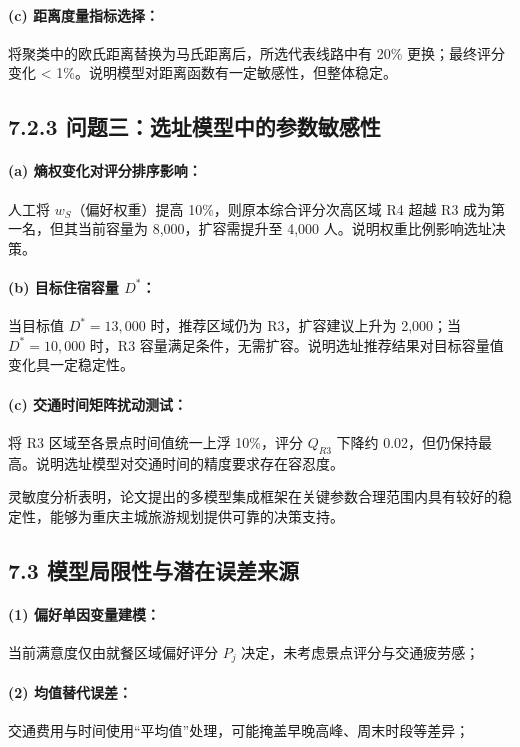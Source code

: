 \documentclass[12pt,a4paper]{article}
\begin{document}
\paragraph{(c) 距离度量指标选择：}
将聚类中的欧氏距离替换为马氏距离后，所选代表线路中有 20\% 更换；最终评分变化 < 1\%。说明模型对距离函数有一定敏感性，但整体稳定。

\subsection*{7.2.3 问题三：选址模型中的参数敏感性}

\paragraph{(a) 熵权变化对评分排序影响：}
人工将 $w_S$（偏好权重）提高 10\%，则原本综合评分次高区域 R4 超越 R3 成为第一名，但其当前容量为 8,000，扩容需提升至 4,000 人。说明权重比例影响选址决策。

\paragraph{(b) 目标住宿容量 $D^*$：}
当目标值 $D^* = 13,000$ 时，推荐区域仍为 R3，扩容建议上升为 2,000；当 $D^* = 10,000$ 时，R3 容量满足条件，无需扩容。说明选址推荐结果对目标容量值变化具一定稳定性。

\paragraph{(c) 交通时间矩阵扰动测试：}
将 R3 区域至各景点时间值统一上浮 10\%，评分 $Q_{R3}$ 下降约 0.02，但仍保持最高。说明选址模型对交通时间的精度要求存在容忍度。

灵敏度分析表明，论文提出的多模型集成框架在关键参数合理范围内具有较好的稳定性，能够为重庆主城旅游规划提供可靠的决策支持。

\subsection*{7.3 模型局限性与潜在误差来源}

\paragraph{(1) 偏好单因变量建模：} 当前满意度仅由就餐区域偏好评分 $P_j$ 决定，未考虑景点评分与交通疲劳感；
\paragraph{(2) 均值替代误差：} 交通费用与时间使用“平均值”处理，可能掩盖早晚高峰、周末时段等差异；
\end{document}
